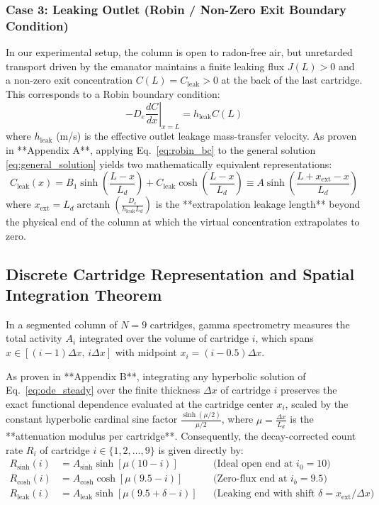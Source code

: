 \documentclass[11pt,a4paper]{article}
\begin{document}
\subsubsection{Case 3: Leaking Outlet (Robin / Non-Zero Exit Boundary Condition)}
In our experimental setup, the column is open to radon-free air, but unretarded transport driven by the emanator maintains a finite leaking flux $J(L) > 0$ and a non-zero exit concentration $C(L) = C_{\text{leak}} > 0$ at the back of the last cartridge. This corresponds to a Robin boundary condition:
\begin{equation}
    -D_e \left.\frac{dC}{dx}\right|_{x=L} = h_{\text{leak}} C(L)
    \label{eq:robin_bc}
\end{equation}
where $h_{\text{leak}}$ (\si{m/s}) is the effective outlet leakage mass-transfer velocity. As proven in **Appendix A**, applying Eq.~\eqref{eq:robin_bc} to the general solution \eqref{eq:general_solution} yields two mathematically equivalent representations:
\begin{equation}
    C_{\text{leak}}(x) = B_1 \sinh\left(\frac{L - x}{L_d}\right) + C_{\text{leak}} \cosh\left(\frac{L - x}{L_d}\right) \equiv A \sinh\left(\frac{L + x_{\text{ext}} - x}{L_d}\right)
    \label{eq:sol_robin}
\end{equation}
where $x_{\text{ext}} = L_d \operatorname{arctanh}\left(\frac{D_e}{h_{\text{leak}} L_d}\right)$ is the **extrapolation leakage length** beyond the physical end of the column at which the virtual concentration extrapolates to zero.

\subsection{Discrete Cartridge Representation and Spatial Integration Theorem}
In a segmented column of $N=9$ cartridges, gamma spectrometry measures the total activity $A_i$ integrated over the volume of cartridge $i$, which spans $x \in [(i-1)\Delta x, \, i\Delta x]$ with midpoint $x_i = (i - 0.5)\Delta x$. 

As proven in **Appendix B**, integrating any hyperbolic solution of Eq.~\eqref{eq:ode_steady} over the finite thickness $\Delta x$ of cartridge $i$ preserves the exact functional dependence evaluated at the cartridge center $x_i$, scaled by the constant hyperbolic cardinal sine factor $\frac{\sinh(\mu/2)}{\mu/2}$, where $\mu = \frac{\Delta x}{L_d}$ is the **attenuation modulus per cartridge**. Consequently, the decay-corrected count rate $R_i$ of cartridge $i \in \{1, 2, \dots, 9\}$ is given directly by:
\begin{align}
    R_{\text{sinh}}(i) &= A_{\text{sinh}} \sinh\left[\mu (10 - i)\right] && \text{(Ideal open end at } i_0 = 10\text{)} \label{eq:disc_sinh} \\
    R_{\text{cosh}}(i) &= A_{\text{cosh}} \cosh\left[\mu (9.5 - i)\right] && \text{(Zero-flux end at } i_b = 9.5\text{)} \label{eq:disc_cosh} \\
    R_{\text{leak}}(i) &= A_{\text{leak}} \sinh\left[\mu (9.5 + \delta - i)\right] && \text{(Leaking end with shift } \delta = x_{\text{ext}}/\Delta x\text{)} \label{eq:disc_robin}
\end{align}
\end{document}

